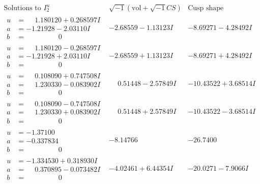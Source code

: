\documentclass[1p]{elsarticle_modified}
\theoremstyle{definition}
\newcommand{\I}{\sqrt{-1}}
\begin{document}
$$\begin{array}{c|c|c}  
\text{Solutions to }I^u_{2}& \I (\text{vol} + \sqrt{-1}CS) & \text{Cusp shape}\\
 \hline 
\begin{aligned}
u &= \phantom{-}1.180120 + 0.268597 I \\
a &= -1.21928 - 2.03110 I \\
b &= \phantom{-0.000000 } 0\end{aligned}
 & -2.68559 - 1.13123 I & -8.69271 - 4.28492 I \\ \hline\begin{aligned}
u &= \phantom{-}1.180120 - 0.268597 I \\
a &= -1.21928 + 2.03110 I \\
b &= \phantom{-0.000000 } 0\end{aligned}
 & -2.68559 + 1.13123 I & -8.69271 + 4.28492 I \\ \hline\begin{aligned}
u &= \phantom{-}0.108090 + 0.747508 I \\
a &= \phantom{-}1.230330 - 0.083902 I \\
b &= \phantom{-0.000000 } 0\end{aligned}
 & \phantom{-}0.51448 - 2.57849 I & -10.43522 + 3.68514 I \\ \hline\begin{aligned}
u &= \phantom{-}0.108090 - 0.747508 I \\
a &= \phantom{-}1.230330 + 0.083902 I \\
b &= \phantom{-0.000000 } 0\end{aligned}
 & \phantom{-}0.51448 + 2.57849 I & -10.43522 - 3.68514 I \\ \hline\begin{aligned}
u &= -1.37100\phantom{ +0.000000I} \\
a &= -0.337834\phantom{ +0.000000I} \\
b &= \phantom{-0.000000 } 0\end{aligned}
 & -8.14766\phantom{ +0.000000I} & -26.7400\phantom{ +0.000000I} \\ \hline\begin{aligned}
u &= -1.334530 + 0.318930 I \\
a &= \phantom{-}0.370895 - 0.073482 I \\
b &= \phantom{-0.000000 } 0\end{aligned}
 & -4.02461 + 6.44354 I & -20.0271 - 7.9066 I \\ \hline\begin{aligned}

\end{aligned}
\end{array}$$
\end{document}

